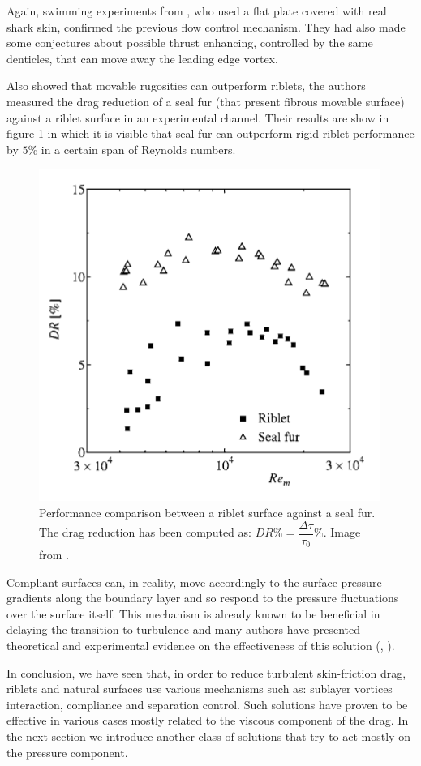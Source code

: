Again, swimming experiments from \citet{Oeffner785}, who used a flat plate covered with real shark skin, confirmed the previous flow control mechanism. They had also made some conjectures about possible thrust enhancing, controlled by the same denticles, that can move away the leading edge vortex.

Also \citet{itoh2006turbulent} showed that movable rugosities can outperform riblets, the authors measured the drag reduction of a seal fur (that present fibrous movable surface) against a riblet surface in an experimental channel. Their results are show in figure \ref{fig:seal} in which it is visible that seal fur can outperform  rigid riblet performance by $5\%$ in a certain span of Reynolds numbers.

\begin{figure}[h]
\centering
\includegraphics[width=0.5\linewidth]{chapter_1/seal}
\caption{Performance comparison between a riblet surface against a seal fur. The drag reduction has been computed as: $DR \% = \dfrac{ \Delta \tau}{\tau_{0}} \%$. Image from \citet{itoh2006turbulent}.}
\label{fig:seal}
\end{figure}


Compliant surfaces can, in reality, move accordingly to the surface pressure gradients along the boundary layer and so respond to the pressure fluctuations over the surface itself.
This mechanism is already known to be beneficial in delaying the transition to turbulence and many authors have presented theoretical and experimental evidence on the effectiveness of this solution (\citet{carpenter1990status}, \citet{bushnell1977effect}).

In conclusion, we have seen that, in order to reduce turbulent skin-friction drag, riblets and natural surfaces use various mechanisms such as: sublayer vortices interaction, compliance and separation control. Such solutions have proven to be effective in various cases mostly related to the viscous component of the drag.
In the next section we introduce another class of solutions that try to act mostly on the pressure component.


